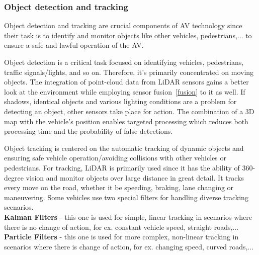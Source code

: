 \documentclass[10pt,oneside,english,a4paper]{article}
\begin{document}
\subsubsection{Object detection and tracking}
\indent Object detection and tracking are crucial components of AV technology since their task is to identify and monitor objects like other vehicles, pedestrians,... to ensure a safe and lawful operation of the AV. 
\par Object detection is a critical task focused on identifying vehicles, pedestrians, traffic signals/lights, and so on. Therefore, it's primarily concentrated on moving objects. The integration of point-cloud data from LiDAR sensors gains a better look at the environment while employing sensor fusion~\ref{fusion} to it as well. If shadows, identical objects and various lighting conditions are a problem for detecting an object, other sensors take place for action. The combination of a 3D map with the vehicle's position enables targeted processing which reduces both processing time and the probability of false detections.
\par Object tracking is centered on the automatic tracking of dynamic objects and ensuring safe vehicle operation/avoiding collisions with other vehicles or pedestrians. For tracking, LiDAR is primarily used since it has the ability of 360-degree vision and monitor objects over large distance in great detail. It tracks every move on the road, whether it be speeding, braking, lane changing or maneuvering. Some vehicles use two special filters for handling diverse tracking scenarios.\\
\indent \textbf{Kalman Filters} - this one is used for simple, linear tracking in scenarios where there is no change of action, for ex. constant vehicle speed, straight roads,...\\
\indent \textbf{Particle Filters} - this one is used for more complex, non-linear tracking in scenarios where there is change of action, for ex. changing speed, curved roads,...
\cite{stateoftheart}\cite{approach}
\end{document}
